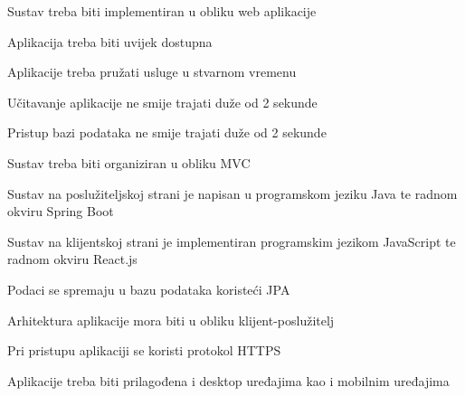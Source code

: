 			\begin{packed_item}
			\item Sustav treba biti implementiran u obliku web aplikacije
			\item Aplikacija treba biti uvijek dostupna
			\item Aplikacije treba pružati usluge u stvarnom vremenu
			\item Učitavanje aplikacije ne smije trajati duže od 2 sekunde
			\item Pristup bazi podataka ne smije trajati duže od 2 sekunde
			\item Sustav treba biti organiziran u obliku MVC
			\item Sustav na poslužiteljskoj strani je napisan u programskom jeziku Java te radnom okviru Spring Boot
			\item Sustav na klijentskoj strani je implementiran programskim jezikom JavaScript te radnom okviru React.js
			\item Podaci se spremaju u bazu podataka koristeći JPA
			\item Arhitektura aplikacije mora biti u obliku klijent-poslužitelj
			\item Pri pristupu aplikaciji se koristi protokol HTTPS
			\item Aplikacije treba biti prilagođena i desktop uređajima kao i mobilnim uređajima
			\end{packed_item}
			 